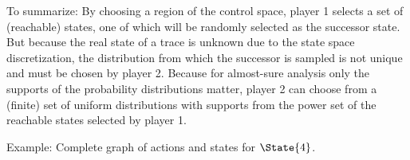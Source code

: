     To summarize:
    By choosing a region of the control space, player 1 selects a set of (reachable) states, one of which will be randomly selected as the successor state.
    But because the real state of a trace is unknown due to the state space discretization, the distribution from which the successor is sampled is not unique and must be chosen by player 2.
    Because for almost-sure analysis only the supports of the probability distributions matter, player 2 can choose from a (finite) set of uniform distributions with supports from the power set of the reachable states selected by player 1.

    Example: %
    Complete graph of actions and states for $\State{4}$.


\stopsubsection

